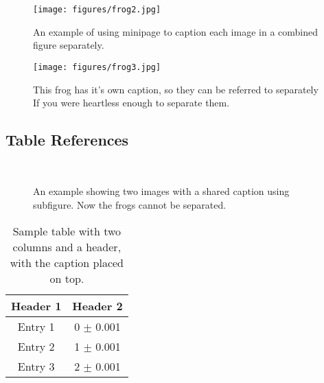 \documentclass[twocolumn]{aastex631}
\begin{document}
\begin{figure}[h]
    \begin{center}
    \begin{minipage}{.35\linewidth}
        \texttt{[image: figures/frog2.jpg]}

        \caption{An example of using minipage to caption each image in a combined figure separately.}
    \end{minipage}\hfill

    \begin{minipage}{.35\linewidth}
        \texttt{[image: figures/frog3.jpg]}

        \caption{This frog has it's own caption, so they can be referred to separately If you were heartless enough to separate them.}
    \end{minipage}
    \label{multifigAB}

    \end{center}

\end{figure}


\subsection{Table References}

\begin{figure}[h]
    \centering
    \mbox{\quad
        }
    \caption{An example showing two images with a shared caption using subfigure. Now the frogs cannot be separated.}
    \label{fig:multifigC}
\end{figure}

\begin{table}[h]
    \centering
    \caption{Sample table with two columns and a header, with the caption placed on top.}
    \label{tab:two_column}
    \vspace{.2in}
    \begin{tabular}{c | c}
        \toprule
        Header 1     & Header 2 \\
        \midrule
        Entry 1      &  0  $\pm$ 0.001  \\
        Entry 2      &  1  $\pm$ 0.001  \\
        Entry 3      &  2  $\pm$ 0.001 \\
        \bottomrule
    \end{tabular}
\end{table}
\end{document}
